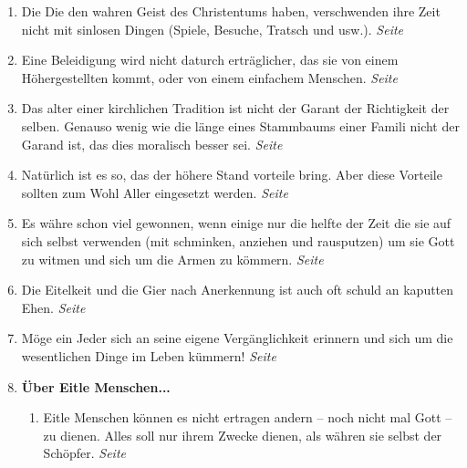 \begin{enumerate}
 \item Die Die den wahren Geist des Christentums haben, verschwenden ihre Zeit
nicht mit sinlosen Dingen (Spiele, Besuche, Tratsch und usw.).
 \dotfill \textit{Seite \pageref{ref:10_08_zeitvertreib}}\\
 
 \item Eine Beleidigung wird nicht daturch erträglicher, das sie von einem
Höhergestellten kommt, oder von einem einfachem Menschen.
 \dotfill \textit{Seite \pageref{ref:11_03_beleidigung}}\\
 
 \item Das alter einer kirchlichen Tradition ist nicht der Garant der
Richtigkeit der selben. Genauso wenig wie die länge eines Stammbaums einer
Famili nicht der Garand ist, das dies moralisch besser sei.
 \dotfill \textit{Seite \pageref{ref:11_04_abstammung}}\\
 
 \item Natürlich ist es so, das der höhere Stand vorteile bring. Aber diese
Vorteile sollten zum Wohl Aller eingesetzt werden.
 \dotfill \textit{Seite \pageref{ref:11_07_standesvorteil}}\\
 
 \item Es währe schon viel gewonnen, wenn einige nur die helfte der Zeit die sie
auf sich selbst verwenden (mit schminken, anziehen und rausputzen) um sie Gott
zu witmen und sich um die Armen zu kömmern.
 \dotfill \textit{Seite \pageref{ref:11_09_putzsucht}}\\
 
 \item Die Eitelkeit und die Gier nach Anerkennung ist auch oft schuld an
kaputten Ehen.
 \dotfill \textit{Seite \pageref{ref:11_09_kaputte_ehen}}\\
 
 \item Möge ein Jeder sich an seine eigene Vergänglichkeit erinnern und sich um
die wesentlichen Dinge im Leben kümmern!
 \dotfill \textit{Seite
\pageref{ref:11_10_juengstes_gericht}}\\

 \item \textbf{Über Eitle Menschen...}
 
\begin{enumerate} 
 \item Eitle Menschen können es nicht ertragen andern -- noch nicht mal Gott -- zu dienen. Alles soll nur ihrem Zwecke dienen, als währen sie selbst der Schöpfer.
 \dotfill \textit{Seite \pageref{ref:12_01_egoisten}}\\


\end{enumerate}
\end{enumerate}
